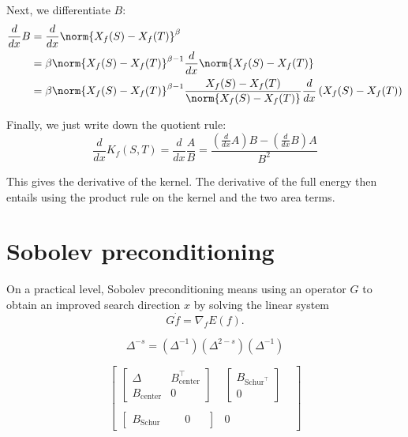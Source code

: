 \documentclass[11pt]{article}
\newcommand{\ddx}{\frac{d}{dx}}
\begin{document}
Next, we differentiate $B$:
\begin{align*}
\ddx B &= \ddx \norm{X_f(S) - X_f(T)}^{\beta}\\
&= \beta \norm{X_f(S) - X_f(T)}^{\beta - 1} \ddx \norm{X_f(S) - X_f(T)}\\
&= \beta \norm{X_f(S) - X_f(T)}^{\beta - 1} \frac{X_f(S) - X_f(T)}{\norm{X_f(S) - X_f(T)}} \ddx \left(X_f(S) - X_f(T)\right)
\end{align*}

Finally, we just write down the quotient rule:
$$\ddx K_f(S, T) = \ddx \frac{A}{B} = \frac{(\ddx A) B - (\ddx B) A}{B^2}$$

This gives the derivative of the kernel. The derivative of the full energy then entails using the product rule on the kernel and the two area terms.

\section{Sobolev preconditioning}

On a practical level, Sobolev preconditioning means using an operator $G$ to obtain an improved search direction $x$ by solving the linear system $$G\dot{f} = \nabla_f E(f).$$

$$\Delta^{-s} = (\Delta^{-1}) (\Delta^{2-s}) (\Delta^{-1})$$

$$
\left[
\begin{array}{lcc}
\left[\begin{array}{ccc}
\Delta & B_{\text{center}}^\top \\
B_{\text{center}} & 0
\end{array}\right] &
\left[\begin{array}{c}
B_{\text{Schur}^\top} \\
0 
\end{array}\right] \\
\ &\ & \\
\left[
\begin{array}{cc}
B_{\text{Schur}}\phantom{mk} & 0 \phantom{mi}
\end{array}
\right] & 0 
\end{array}
\right]
$$
\end{document}
